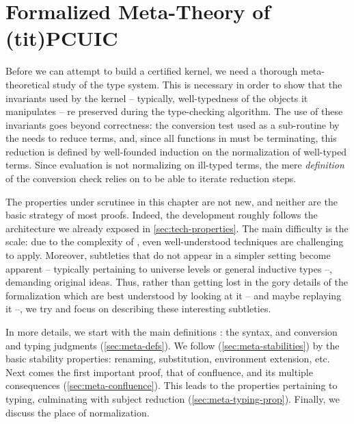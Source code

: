 
\chapter{Formalized Meta-Theory of \kl(tit){PCUIC}}
\label{chap:metacoq-general}

\margintoc

Before we can attempt to build a certified kernel, we need a thorough meta-theoretical study
of the type system. This is necessary in order to show that the invariants used by the kernel – typically, well-typedness of the objects it manipulates – 
re preserved during the type-checking algorithm.
The use of these invariants goes beyond correctness:
the conversion test used as a sub-routine by the  needs to reduce terms, and,
since all functions in  must be terminating,
this reduction is defined by well-founded induction on the normalization of well-typed terms.
Since evaluation is not normalizing on ill-typed terms, the mere \emph{definition} of the
conversion check relies on  to be able to iterate reduction steps.

The properties under scrutinee in this chapter are not new,
and neither are the basic strategy of most proofs.
Indeed, the development roughly follows the architecture we already exposed in
\cref{sec:tech-properties}. The main difficulty is the scale: due to the
complexity of , even well-understood techniques are challenging to apply.
Moreover, subtleties that do not appear in a simpler setting become apparent –
typically pertaining to universe levels or general inductive types –,
demanding original ideas. Thus, rather than getting lost in
the gory details of the formalization which are best understood by looking at it
– and maybe replaying it –, we try and focus on describing these interesting subtleties.

In more details, we start with the main definitions : the syntax, and conversion and typing
judgments (\cref{sec:meta-defs}). We follow (\cref{sec:meta-stabilities}) by the basic
stability properties: renaming, substitution, environment extension, etc.
Next comes the first important proof, that of confluence, and its multiple consequences
(\cref{sec:meta-confluence}). This leads to the properties pertaining to typing, culminating
with subject reduction (\cref{sec:meta-typing-prop}).
Finally, we discuss the place of normalization.


